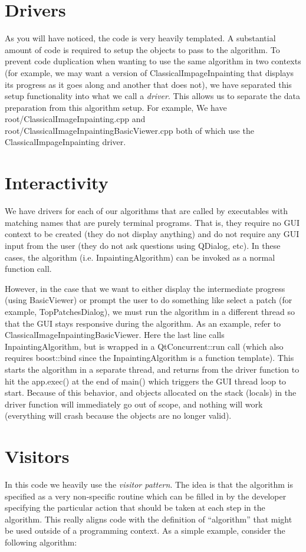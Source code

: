 \documentclass{InsightArticle}
\begin{document}
\section{Drivers}
As you will have noticed, the code is very heavily templated. A substantial amount of code is required to setup the objects to pass to the algorithm. To prevent code duplication when wanting to use the same algorithm in two contexts (for example, we may want a version of ClassicalImpageInpainting that displays its progress as it goes along and another that does not), we have separated this setup functionality into what we call a \emph{driver}. This allows us to separate the data preparation from this algorithm setup. For example, We have root/ClassicalImageInpainting.cpp and root/ClassicalImageInpaintingBasicViewer.cpp both of which use the ClassicalImpageInpainting driver.

\section{Interactivity}
We have drivers for each of our algorithms that are called by executables with matching names that are purely terminal programs. That is, they require no GUI context to be created (they do not display anything) and do not require any GUI input from the user (they do not ask questions using QDialog, etc). In these cases, the algorithm  (i.e. InpaintingAlgorithm) can be invoked as a normal function call.

However, in the case that we want to either display the intermediate progress (using BasicViewer) or prompt the user to do something like select a patch (for example, TopPatchesDialog), we must run the algorithm in a different thread so that the GUI stays responsive during the algorithm. As an example, refer to ClassicalImageInpaintingBasicViewer. Here the last line calls InpaintingAlgorithm, but is wrapped in a QtConcurrent::run call (which also requires boost::bind since the InpaintingAlgorithm is a function template). This starts the algorithm in a separate thread, and returns from the driver function to hit the app.exec() at the end of main() which triggers the GUI thread loop to start. Because of this behavior, and objects allocated on the stack (locals) in the driver function will immediately go out of scope, and nothing will work (everything will crash because the objects are no longer valid).

\section{Visitors}
In this code we heavily use the \emph{visitor pattern}. The idea is that the algorithm is specified as a very non-specific routine which can be filled in by the developer specifying the particular action that should be taken at each step in the algorithm. This really aligns code with the definition of ``algorithm'' that might be used outside of a programming context. As a simple example, consider the following algorithm:
\end{document}
